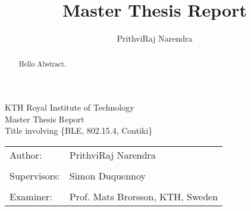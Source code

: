 \documentclass[a4paper,11pt]{report}
\title{Master Thesis Report}
\author{PrithviRaj Narendra}
\begin{document}

\begin{titlepage}
\thispagestyle{empty}
\begin{center}
  \vspace{.5cm}
  \huge{\sc KTH Royal Institute of Technology}\\
  \vspace{.5cm}
  \vspace{3.5cm}
  \large Master Thesis Report\\
  \vspace{2cm}		
  \LARGE{Title involving \{BLE, 802.15.4, Contiki\}}
  \vspace{4.5cm} 

\begin{tabular}{ll} 
\noindent Author: & PrithviRaj Narendra \\
					& \\
\noindent Supervisors: & Simon Duquennoy \\ 
					   & \\
													
\indent Examiner:  & Prof. Mats Brorsson, KTH, Sweden\\ 

\end{tabular}
\end{center} 
\end{titlepage}

\begin{abstract}
Hello Abstract.
\end{abstract}

\tableofcontents

\glsnogroupskiptrue
\renewcommand{\glsnamefont}[1]{\textbf{#1}}
\setlength{\glsdescwidth}{0.8\hsize}
\printglossary[style=long,title=List of Abbreviations,type=\acronymtype]












\printbibliography[title={References}]

\appendix

\end{document}
